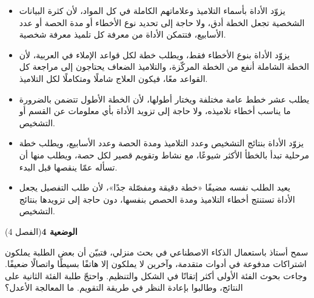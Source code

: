 \documentclass[11pt,a4paper]{article}
\begin{document}
\begin{itemize}[leftmargin=1.0cm, labelsep=6pt, itemsep=3pt, topsep=4pt, parsep=0pt]
  \item[\textbf{أ)}] يزوّد الأداة بأسماء التلاميذ وعلاماتهم الكاملة في كل المواد، لأن كثرة البيانات الشخصية تجعل الخطة أدق، ولا حاجة إلى تحديد نوع الأخطاء أو مدة الحصة أو عدد الأسابيع، فتتمكن الأداة من معرفة كل تلميذ معرفة شخصية.
  \item[\textbf{ب)}] يزوّد الأداة بنوع الأخطاء فقط، ويطلب خطة لكل قواعد الإملاء في العربية، لأن الخطة الشاملة أنفع من الخطة المركّزة، والتلاميذ الضعاف يحتاجون إلى مراجعة كل القواعد معًا، فيكون العلاج شاملًا ومتكاملًا لكل التلاميذ.
  \item[\textbf{ج)}] يطلب عشر خطط عامة مختلفة ويختار أطولها، لأن الخطة الأطول تتضمن بالضرورة ما يناسب أخطاء تلاميذه، ولا حاجة إلى تزويد الأداة بأي معلومات عن القسم أو التشخيص.
  \item[\textbf{د)}] يزوّد الأداة بنتائج التشخيص وعدد التلاميذ ومدة الحصة وعدد الأسابيع، ويطلب خطة مرحلية تبدأ بالخطأ الأكثر شيوعًا، مع نشاط وتقويم قصير لكل حصة، ويطلب منها أن تسأله عمّا ينقصها قبل البدء.
  \item[\textbf{هـ)}] يعيد الطلب نفسه مضيفًا «خطة دقيقة ومفصّلة جدًا»، لأن طلب التفصيل يجعل الأداة تستنتج أخطاء التلاميذ ومدة الحصص بنفسها، دون حاجة إلى تزويدها بنتائج التشخيص.
\end{itemize}
\par\vspace{6pt}
\noindent
{\large\khatt\textbf{الوضعية 4}}\hfill{\small(الفصل 4)}\par\nopagebreak\vspace{3pt}
\setlength{\fboxsep}{7pt}\colorbox{gray!10}{\parbox{\dimexpr\linewidth-14pt}{سمح أستاذ باستعمال الذكاء الاصطناعي في بحث منزلي، فتبيّن أن بعض الطلبة يملكون اشتراكات مدفوعة في أدوات متقدمة، وآخرين لا يملكون إلا هاتفًا بسيطًا واتصالًا ضعيفًا. وجاءت بحوث الفئة الأولى أكثر إتقانًا في الشكل والتنظيم. واحتجّ طلبة الفئة الثانية على النتائج، وطالبوا بإعادة النظر في طريقة التقويم. ما المعالجة الأعدل؟}}\par\nopagebreak
\end{document}

